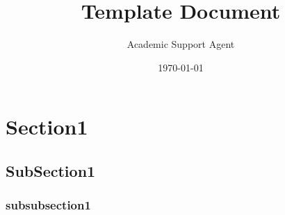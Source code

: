 \documentclass{article}
\title{Template Document}
\author{Academic Support Agent}
\date{\today}
\begin{document}
\maketitle





\newpage

\section{Section1}
\subsection{SubSection1}
\subsubsection{subsubsection1}
\end{document}

